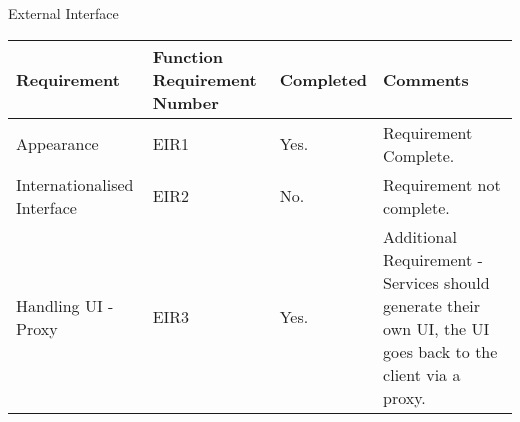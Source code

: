 External Interface \\
\begin{center}
\begin{tabular}{ |l|l|l|l| }
\hline

Requirement & Function Requirement Number & Completed & Comments \\
\hline
Appearance & EIR1 & Yes. & Requirement Complete. \\
Internationalised Interface & EIR2 & No. & Requirement not complete. \\
Handling UI - Proxy & EIR3 & Yes. & Additional Requirement - Services should generate their own UI, the UI goes back to the client via a proxy. \\


\hline
\end{tabular}
\end{center}